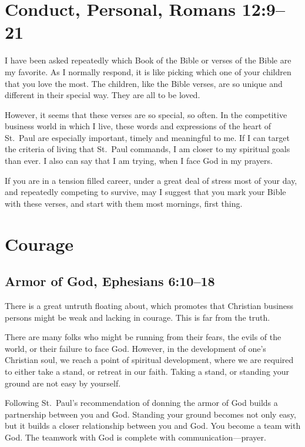 \documentclass[12pt]{memoir}
\begin{document}
\section[Conduct, Personal]{Conduct, Personal, Romans 12:9--21}

I have been asked repeatedly which Book of the Bible or verses of
the Bible are my favorite. As I normally respond, it is like picking
which one of your children that you love the most. The children, like
the Bible verses, are so unique and different in their special way.
They are all to be loved.

However, it seems that these verses are so special, so often.
In the
competitive business world in which I live, these words and expressions
of the heart of St.~Paul are especially important, timely and meaningful to
me. If I can target the criteria of living that St.~Paul commands,
I am closer to my spiritual goals than ever. I also can say that I
am trying, when I face God in my prayers.

If you are in a tension filled career, under a great deal of stress
most of your day, and repeatedly competing to survive, may I suggest
that you mark your Bible with these verses, and start with them most
mornings, first thing.

\section{Courage}

\subsection[Armor of God]{Armor of God, Ephesians 6:10--18}

There is a great untruth floating about, which promotes that Christian
business persons might be weak and lacking in courage. This is far
from the truth.

There are many folks who might be running from their fears, the evils
of the world, or their failure to face God. However, in the development
of one's Christian soul, we reach a point of spiritual development,
where we are required to either take a stand, or retreat in our faith.
Taking a stand, or standing your ground are not easy by
yourself.

Following St.~Paul's recommendation of donning the armor of God builds
a partnership between you and God. Standing your ground becomes not only easy, but it builds a closer relationship between you and
God. You become a team with God. The teamwork with God is complete
with communication---prayer.
\end{document}
